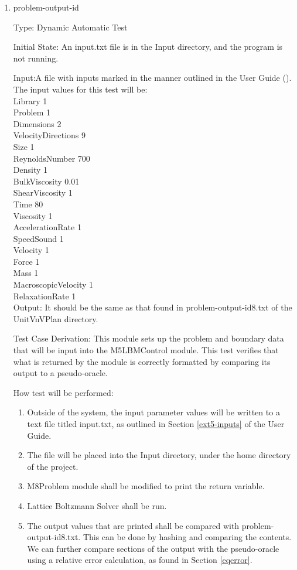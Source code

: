 \documentclass[12pt, titlepage]{article}
\newcommand{\myprogname}{Lattice Boltzmann Solver}
\newcounter{uvtestcounter} %
\begin{document}
\begin{enumerate}
	
	\item{problem-output-id\theuvtestcounter\\}
	
	Type: Dynamic Automatic Test
	
Initial State: An input.txt file is in the Input directory, and the program is not running.

Input:A file with inputs marked in the manner outlined in the
User Guide (\citet{LBM_UserGuide_PM}).\\The input values for this test will
be:\\

Library 1\\
Problem 1\\
Dimensions 2\\
VelocityDirections 9\\
Size 1\\
ReynoldsNumber 700\\
Density 1\\
BulkViscosity 0.01\\
ShearViscosity 1\\
Time 80\\
Viscosity 1\\
AccelerationRate 1\\
SpeedSound 1\\
Velocity 1\\
Force 1\\
Mass 1\\
MacroscopicVelocity 1\\
RelaxationRate 1\\
	
	Output: It should be the same as that found in problem-output-id8.txt of the UnitVnVPlan directory.

Test Case Derivation: This module sets up the problem and boundary data that will be input into the M5LBMControl module. This test verifies that what is returned by the module is correctly formatted by comparing its output to a pseudo-oracle.

How test will be performed: 
\begin{enumerate}
	\item Outside of the system, the input parameter values will be written to a text file titled input.txt, as outlined in Section \ref{ext5-inputs} of the User Guide.
	\item The file will be placed into the Input directory, under the home directory of the project.
	\item M8Problem module shall be modified to print the return variable.
	\item {\myprogname} shall be run. 
	\item The output values that are printed shall be compared with problem-output-id8.txt. This can be done by hashing and comparing the contents. We can further compare sections of the output with the pseudo-oracle using a relative error calculation, as found in Section \ref{eqerror}.
\end{enumerate}
	 
\end{enumerate}
\end{document}
